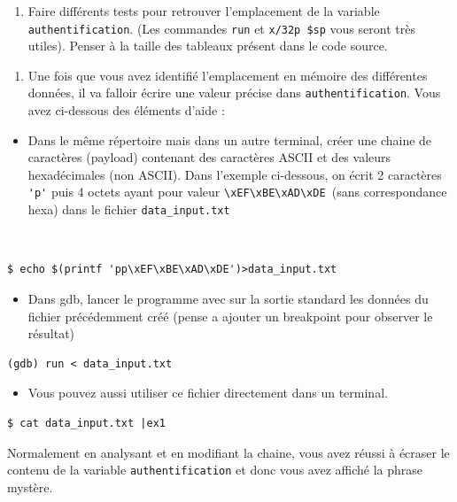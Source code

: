 \documentclass[french, 12pt]{article}%
\newcommand{\itemE}{\item[$\bullet$]}
\begin{document}
\begin{enumerate}[resume]
\item Faire différents tests pour retrouver l'emplacement de la variable \verb?authentification?. (Les commandes \verb?run? et \verb?x/32p $sp? vous seront très utiles). Penser à la taille des tableaux présent dans le code source.
\end{enumerate}

\begin{enumerate}[resume]
\item Une fois que vous avez identifié l'emplacement en mémoire des différentes données, il va falloir écrire une valeur précise dans \verb?authentification?. Vous avez ci-dessous des éléments d'aide :
\end{enumerate}

\begin{itemize}
\itemE Dans le même répertoire mais dans un autre terminal, créer une chaine de caractères (payload) contenant des caractères ASCII et des valeurs hexadécimales (non ASCII). Dans l'exemple ci-dessous, on écrit 2 caractères \verb?'p'? puis 4 octets ayant pour valeur \verb?\xEF\xBE\xAD\xDE ?(sans correspondance hexa) dans le fichier \verb?data_input.txt? 
\end{itemize}
\
\begin{lstlisting}[style=commande]
$ echo $(printf 'pp\xEF\xBE\xAD\xDE')>data_input.txt
\end{lstlisting}

\begin{itemize}
\itemE Dans gdb, lancer le programme avec sur la sortie standard les données du fichier précédemment créé (pense a ajouter un breakpoint pour observer le résultat)
\end{itemize}

\begin{lstlisting}[style=commande]
(gdb) run < data_input.txt 
\end{lstlisting}

\begin{itemize}
\itemE Vous pouvez aussi utiliser ce fichier directement dans un terminal. 
\end{itemize}

\begin{lstlisting}[style=commande]
$ cat data_input.txt |ex1
\end{lstlisting}

Normalement en analysant et en modifiant la chaine, vous avez réussi à écraser le contenu de la variable \verb?authentification? et donc vous avez affiché la phrase mystère.
\end{document}

